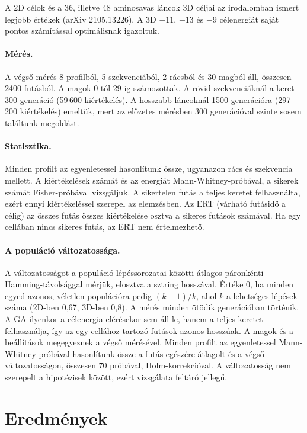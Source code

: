 \documentclass[11pt,a4paper]{article}
\begin{document}
A 2D célok és a 36, illetve 48 aminosavas láncok 3D céljai az irodalomban
ismert legjobb értékek (arXiv 2105.13226). A 3D $-11$, $-13$ és $-9$
célenergiát saját pontos számítással optimálisnak igazoltuk.

\paragraph{Mérés.} A végső mérés 8 profilból, 5 szekvenciából, 2 rácsból és 30
magból áll, összesen 2400 futásból. A magok 0-tól 29-ig számozottak. A rövid szekvenciáknál a keret 300 generáció (59\,600
kiértékelés). A hosszabb láncoknál 1500 generációra (297\,200 kiértékelés)
emeltük, mert az előzetes mérésben 300 generációval szinte sosem találtunk
megoldást.

\paragraph{Statisztika.} Minden profilt az egyenletessel hasonlítunk össze,
ugyanazon rács és szekvencia mellett. A kiértékelések számát és az energiát
Mann-Whitney-próbával, a sikerek számát Fisher-próbával vizsgáljuk. A sikertelen futás a teljes keretet felhasználta, ezért
ennyi kiértékeléssel szerepel az elemzésben. Az ERT (várható futásidő a célig)
az összes futás összes kiértékelése osztva a sikeres futások számával. Ha egy
cellában nincs sikeres futás, az ERT nem értelmezhető.

\paragraph{A populáció változatossága.} A változatosságot a populáció
lépéssorozatai közötti átlagos páronkénti Hamming-távolsággal mérjük, elosztva a
sztring hosszával. Értéke 0, ha minden egyed azonos, véletlen populációra pedig
$(k-1)/k$, ahol $k$ a lehetséges lépések száma (2D-ben 0,67, 3D-ben 0,8). A mérés
minden ötödik generációban történik. A GA ilyenkor a célenergia elérésekor sem
áll le, hanem a teljes keretet felhasználja, így az egy cellához tartozó futások
azonos hosszúak. A magok és a beállítások megegyeznek a végső mérésével. Minden profilt az egyenletessel
Mann-Whitney-próbával hasonlítunk össze a futás egészére átlagolt és a végső
változatosságon, összesen 70 próbával, Holm-korrekcióval. A változatosság nem
szerepelt a hipotézisek között, ezért vizsgálata feltáró jellegű.

\section{Eredmények}
\end{document}
